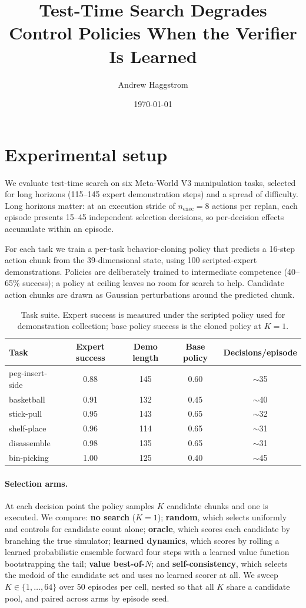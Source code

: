 \documentclass[11pt]{article}
\title{Test-Time Search Degrades Control Policies When the Verifier Is Learned}
\author{Andrew Haggstrom}
\date{\today}
\begin{document}
\maketitle

\section{Experimental setup}

We evaluate test-time search on six Meta-World V3 manipulation tasks, selected
for long horizons (115--145 expert demonstration steps) and a spread of
difficulty. Long horizons matter: at an execution stride of $n_{\text{exec}}=8$
actions per replan, each episode presents 15--45 independent selection
decisions, so per-decision effects accumulate within an episode.

For each task we train a per-task behavior-cloning policy that predicts a
16-step action chunk from the 39-dimensional state, using 100 scripted-expert
demonstrations. Policies are deliberately trained to intermediate competence
(40--65\% success); a policy at ceiling leaves no room for search to help.
Candidate action chunks are drawn as Gaussian perturbations around the predicted
chunk.

\begin{table}[t]
\centering
\small
\begin{tabular}{lcccc}
\toprule
Task & Expert success & Demo length & Base policy & Decisions/episode \\
\midrule
peg-insert-side & 0.88 & 145 & 0.60 & $\sim$35 \\
basketball      & 0.91 & 132 & 0.45 & $\sim$40 \\
stick-pull      & 0.95 & 143 & 0.65 & $\sim$32 \\
shelf-place     & 0.96 & 114 & 0.65 & $\sim$31 \\
disassemble     & 0.98 & 135 & 0.65 & $\sim$31 \\
bin-picking     & 1.00 & 125 & 0.40 & $\sim$45 \\
\bottomrule
\end{tabular}
\caption{Task suite. Expert success is measured under the scripted policy used
for demonstration collection; base policy success is the cloned policy at $K=1$.}
\label{tab:tasks}
\end{table}

\paragraph{Selection arms.}
At each decision point the policy samples $K$ candidate chunks and one is
executed. We compare: \textbf{no search} ($K=1$); \textbf{random}, which selects
uniformly and controls for candidate count alone; \textbf{oracle}, which scores
each candidate by branching the true simulator; \textbf{learned dynamics}, which
scores by rolling a learned probabilistic ensemble forward four steps with a
learned value function bootstrapping the tail; \textbf{value best-of-$N$}; and
\textbf{self-consistency}, which selects the medoid of the candidate set and
uses no learned scorer at all. We sweep $K \in \{1,\dots,64\}$ over 50 episodes
per cell, nested so that all $K$ share a candidate pool, and paired across arms
by episode seed.
\end{document}
